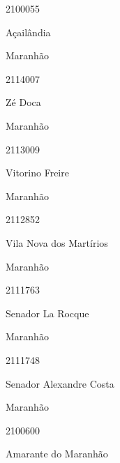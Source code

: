 \documentclass[
  letterpaper,
]{report}
\begin{document}
2100055

\n      

Açailândia

\n    

\n    

\n      

Maranhão

\n      

2114007

\n      

Zé Doca

\n    

\n    

\n      

Maranhão

\n      

2113009

\n      

Vitorino Freire

\n    

\n    

\n      

Maranhão

\n      

2112852

\n      

Vila Nova dos Martírios

\n    

\n    

\n      

Maranhão

\n      

2111763

\n      

Senador La Rocque

\n    

\n    

\n      

Maranhão

\n      

2111748

\n      

Senador Alexandre Costa

\n    

\n    

\n      

Maranhão

\n      

2100600

\n      

Amarante do Maranhão

\n    
\end{document}
